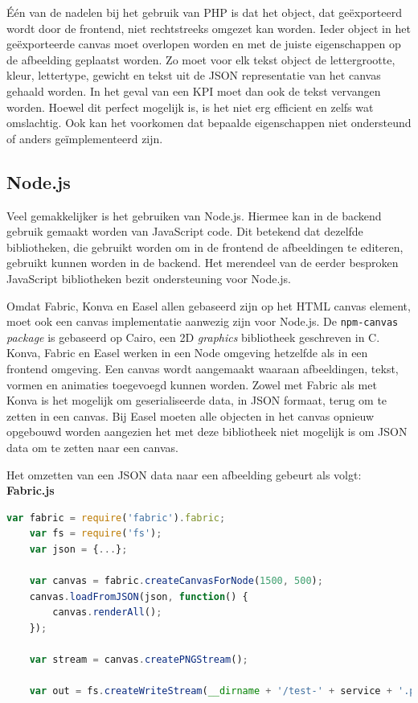 \'{E}\'{e}n van de nadelen bij het gebruik van PHP is dat het object, dat ge\"{e}xporteerd wordt door de frontend, niet rechtstreeks omgezet kan worden. Ieder object in het ge\"{e}xporteerde canvas moet overlopen worden en met de juiste eigenschappen op de afbeelding geplaatst worden. Zo moet voor elk tekst object de lettergrootte, kleur, lettertype, gewicht en tekst uit de JSON representatie van het canvas gehaald worden. In het geval van een KPI moet dan ook de tekst vervangen worden. Hoewel dit perfect mogelijk is, is het niet erg efficient en zelfs wat omslachtig. Ook kan het voorkomen dat bepaalde eigenschappen niet ondersteund of anders ge\"{i}mplementeerd zijn. 

\subsection{Node.js} \label{BackendImplementationNodeJS}
Veel gemakkelijker is het gebruiken van Node.js. Hiermee kan in de backend gebruik gemaakt worden van JavaScript code. Dit betekend dat dezelfde bibliotheken, die gebruikt worden om in de frontend de afbeeldingen te editeren, gebruikt kunnen worden in de backend. Het merendeel van de eerder besproken JavaScript bibliotheken bezit ondersteuning voor Node.js. 

Omdat Fabric, Konva en Easel allen gebaseerd zijn op het HTML canvas element, moet ook een canvas implementatie aanwezig zijn voor Node.js. De \texttt{npm-canvas} \textit{package} is gebaseerd op Cairo, een 2D \textit{graphics} bibliotheek geschreven in C. %
Konva, Fabric en Easel werken in een Node omgeving hetzelfde als in een frontend omgeving. Een canvas wordt aangemaakt waaraan afbeeldingen, tekst, vormen en animaties toegevoegd kunnen worden. Zowel met Fabric als met Konva is het mogelijk om geserialiseerde data, in JSON formaat, terug om te zetten in een canvas. Bij Easel moeten alle objecten in het canvas opnieuw opgebouwd worden aangezien het met deze bibliotheek niet mogelijk is om JSON data om te zetten naar een canvas. 

Het omzetten van een JSON data naar een afbeelding gebeurt als volgt:
\textbf{Fabric.js}
\begin{lstlisting}[language=javascript]
	var fabric = require('fabric').fabric;
	var fs = require('fs');
	var json = {...};
	
	var canvas = fabric.createCanvasForNode(1500, 500);
	canvas.loadFromJSON(json, function() {
		canvas.renderAll();
	});
	
	var stream = canvas.createPNGStream();
	
	var out = fs.createWriteStream(__dirname + '/test-' + service + '.png');
\end{lstlisting}

